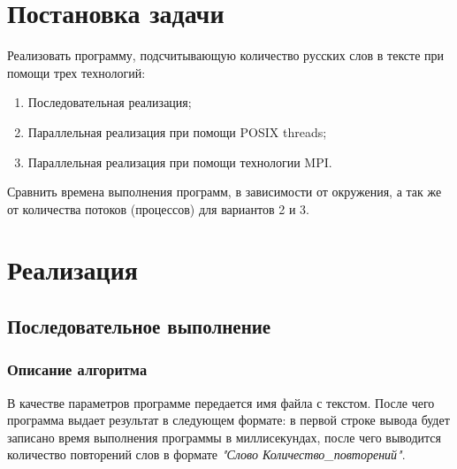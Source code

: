 \documentclass[12pt,a4paper]{report}
\begin{document}
	
	
	\renewcommand{\thesection}{\arabic{section}}
	\tableofcontents
	\pagebreak
	
	\setcounter{totalnumber}{10}
	\setcounter{topnumber}{10}
	\setcounter{bottomnumber}{10}
	\renewcommand{\topfraction}{1}
	\renewcommand{\textfraction}{0}
	
	\section{Постановка задачи}
		Реализовать программу, подсчитывающую количество русских слов в тексте при помощи трех технологий:
		\begin{enumerate}
			\item Последовательная реализация;
			\item Параллельная реализация при помощи POSIX threads;
			\item Параллельная реализация при помощи технологии MPI.
		\end{enumerate}
		Сравнить времена выполнения программ, в зависимости от окружения, а так же от количества потоков (процессов) для вариантов 2 и 3.
	\section{Реализация}
		\subsection{Последовательное выполнение}
			\subsubsection{Описание алгоритма}
				В качестве параметров программе передается имя файла с текстом. После чего программа выдает результат в следующем формате: в первой строке вывода будет записано время выполнения программы в миллисекундах, после чего выводится количество повторений слов в формате \textit{"Слово Количество\_повторений"}.
				
\end{document}
